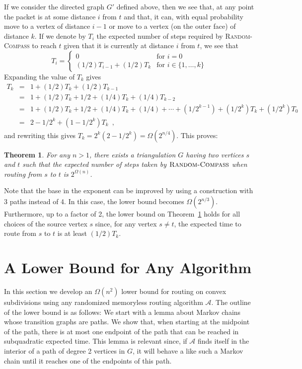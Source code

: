 \documentclass [letterpaper] {patmorin}
\newtheorem{theorem}{Theorem}%
\begin{document}
If we consider the directed graph $G'$ defined above, then we see that, at any point the packet is at some distance $i$ from $t$ and that, it can, with equal probability move to a vertex  of distance $i-1$ or move to a vertex (on the outer face) of distance $k$.  If we denote by $T_i$ the expected number of steps required by \textsc{Random-Compass} to reach $t$ given that it is currently at distance $i$ from $t$, we see that 
\[ 
  T_i = \left\{ \begin{array}{ll}
          0 & \mbox{for $i=0$} \\
          (1/2)T_{i-1} + (1/2)T_k & \mbox{for $i\in\{1,\ldots,k\}$} 
        \end{array}\right.
\]
Expanding the value of $T_k$ gives
\begin{eqnarray*}
  T_k & = & 1 + (1/2)T_k + (1/2)T_{k-1} \\
      & = & 1 + (1/2)T_k + 1/2 + (1/4)T_{k} + (1/4)T_{k-2} \\
      & = & 1 + (1/2)T_k + 1/2 + (1/4)T_{k} + (1/4)
              + \cdots  + (1/2^{k-1}) + (1/2^{k})T_{k} + (1/2^{k})T_0 \\
      & = & 2-1/2^{k} + (1-1/2^k)T_k \enspace ,
\end{eqnarray*}
and rewriting this gives $T_k = 2^k(2-1/2^{k}) = \Omega(2^{n/4})$.  This proves:

\begin{theorem}\label{theorem:random-compass}
For any $n>1$, there exists a triangulation $G$ having two vertices $s$ and $t$ such that the expected number of steps taken by $\textsc{Random-Compass}$ when routing from $s$ to $t$ is $2^{\Omega(n)}$.
\end{theorem}

Note that the base in the exponent can be improved by using a construction with 3 paths instead of 4.  In this case, the lower bound becomes $\Omega(2^{n/3})$.  Furthermore, up to a factor of 2, the lower bound on Theorem~\ref{theorem:random-compass} holds for all choices of the source vertex $s$ since, for any vertex $s\neq t$, the expected time to route from $s$ to $t$ is at least $(1/2)T_k$.

\section{A Lower Bound for Any Algorithm}

In this section we develop an $\Omega(n^2)$ lower bound for routing on convex subdivisions using any randomized memoryless routing algorithm $\mathcal{A}$.  The outline of the lower bound is as follows:  We start with a lemma about Markov chains whose transition graphs are paths. We show that, when starting at the midpoint of the path, there is at most one endpoint of the path that can be reached in subquadratic expected time.  This lemma is relevant since, if $\mathcal{A}$ finds itself in the interior of a path of degree 2 vertices in $G$, it will behave a like such a Markov chain until it reaches one of the endpoints of this path.
\end{document}
